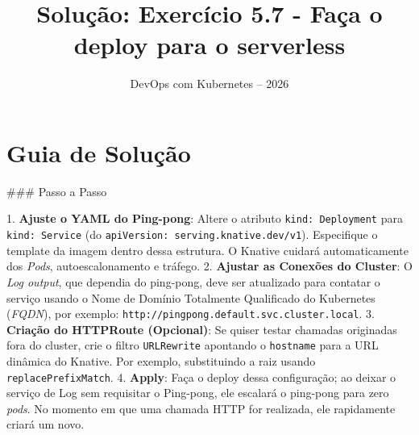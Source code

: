 \documentclass[11pt,a4paper]{article}
\title{\color{secondary}\Huge\textbf{Solução: Exercício 5.7 - Faça o deploy para o serverless}}
\author{\color{primary}DevOps com Kubernetes -- 2026}
\date{}
\begin{document}
\maketitle

\section*{\color{primary}Guia de Solução}
\begin{tcolorbox}[colback=green!5!white,colframe=green!60!black,title=Resolução Passo a Passo]
### Passo a Passo

1. \textbf{Ajuste o YAML do Ping-pong}: Altere o atributo \texttt{kind: Deployment} para \texttt{kind: Service} (do \texttt{apiVersion: serving.knative.dev/v1}). Especifique o template da imagem dentro dessa estrutura. O Knative cuidará automaticamente dos \textit{Pods}, autoescalonamento e tráfego.
2. \textbf{Ajustar as Conexões do Cluster}: O \textit{Log output}, que dependia do ping-pong, deve ser atualizado para contatar o serviço usando o Nome de Domínio Totalmente Qualificado do Kubernetes (\textit{FQDN}), por exemplo: \texttt{http://pingpong.default.svc.cluster.local}.
3. \textbf{Criação do HTTPRoute (Opcional)}: Se quiser testar chamadas originadas fora do cluster, crie o filtro \texttt{URLRewrite} apontando o \texttt{hostname} para a URL dinâmica do Knative. Por exemplo, substituindo a raiz usando \texttt{replacePrefixMatch}. 
4. \textbf{Apply}: Faça o deploy dessa configuração; ao deixar o serviço de Log sem requisitar o Ping-pong, ele escalará o ping-pong para zero \textit{pods}. No momento em que uma chamada HTTP for realizada, ele rapidamente criará um novo.
\end{tcolorbox}
\end{document}
